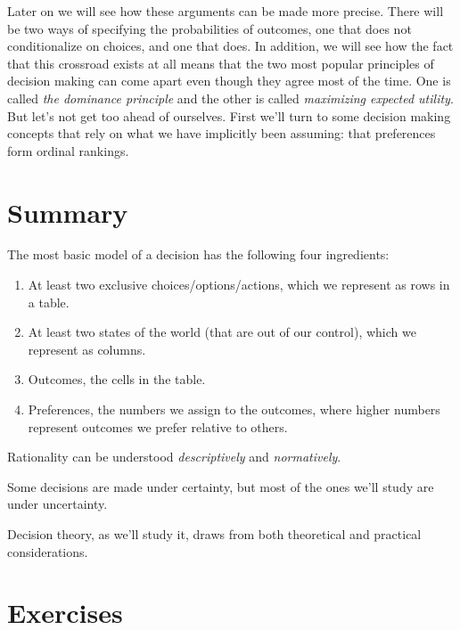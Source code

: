 \documentclass[]{tufte-book}
\providecommand{\tightlist}{%
  \setlength{\itemsep}{0pt}\setlength{\parskip}{0pt}}
\begin{document}
Later on we will see how these arguments can be made more precise. There will be two ways of specifying the probabilities of outcomes, one that does not conditionalize on choices, and one that does. In addition, we will see how the fact that this crossroad exists at all means that the two most popular principles of decision making can come apart even though they agree most of the time. One is called \emph{the dominance principle} and the other is called \emph{maximizing expected utility}. But let's not get too ahead of ourselves. First we'll turn to some decision making concepts that rely on what we have implicitly been assuming: that preferences form ordinal rankings.

\hypertarget{summary}{%
\section{Summary}\label{summary}}

The most basic model of a decision has the following four ingredients:

\begin{enumerate}
\def\labelenumi{\arabic{enumi}.}
\tightlist
\item
  At least two exclusive choices/options/actions, which we represent as rows in a table.
\item
  At least two states of the world (that are out of our control), which we represent as columns.
\item
  Outcomes, the cells in the table.
\item
  Preferences, the numbers we assign to the outcomes, where higher numbers represent outcomes we prefer relative to others.
\end{enumerate}

Rationality can be understood \emph{descriptively} and \emph{normatively}.

Some decisions are made under certainty, but most of the ones we'll study are under uncertainty.

Decision theory, as we'll study it, draws from both theoretical and practical considerations.

\hypertarget{exercises}{%
\section*{Exercises}\label{exercises}}
\end{document}
